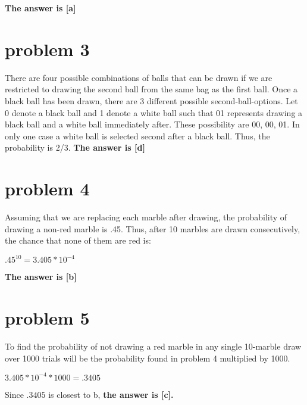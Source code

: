 \documentclass{article}
\begin{document}
\textbf{The answer is [a]}

\section*{problem 3}
There are four possible combinations of balls that can be drawn if we are restricted to drawing the second ball from the same bag as the first ball. Once a black ball has been drawn, there are 3 different possible second-ball-options. Let 0 denote a black ball and 1 denote a white ball such that 01 represents drawing a black ball and a white ball immediately after. These possibility are 00, 00, 01. In only one case a white ball is selected second after a black ball. Thus, the probability is 2/3. 
\newline
\newline
\textbf{The answer is [d]}

\section*{problem 4}
Assuming that we are replacing each marble after drawing, the probability of drawing a non-red marble is .45. Thus, after 10 marbles are drawn consecutively, the chance that none of them are red is:
\begin{center}
    $.45^{10}=3.405 * 10^{-4}$
\end{center}
\textbf{The answer is [b]}

\section*{problem 5}
To find the probability of not drawing a red marble in any single 10-marble draw over 1000 trials will be the probability found in problem 4 multiplied by 1000.
\begin{center}
    $3.405 * 10^{-4} * 1000 = .3405$
\end{center}{}
Since $.3405$ is closest to b, \textbf{the answer is [c].}
\end{document}
